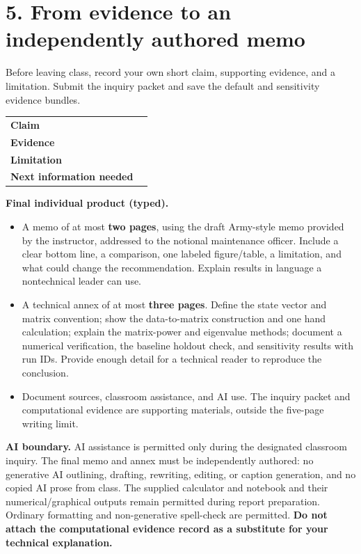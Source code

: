\documentclass[10pt,letterpaper]{article}
\begin{document}
\newpage
\section*{5. From evidence to an independently authored memo}
Before leaving class, record your own short claim, supporting evidence, and a limitation. Submit the inquiry packet and save the default and sensitivity evidence bundles.
\begin{center}
\begin{tabularx}{\textwidth}{>{\bfseries}p{1.05in}Y}
\toprule
Claim & \\[0.45in]
Evidence & \\[0.45in]
Limitation & \\[0.45in]
Next information needed & \\[0.45in]
\bottomrule
\end{tabularx}
\end{center}
\textbf{Final individual product (typed).}
\begin{itemize}[nosep]
\item A memo of at most \textbf{two pages}, using the draft Army-style memo provided by the instructor, addressed to the notional maintenance officer. Include a clear bottom line, a comparison, one labeled figure/table, a limitation, and what could change the recommendation. Explain results in language a nontechnical leader can use.
\item A technical annex of at most \textbf{three pages}. Define the state vector and matrix convention; show the data-to-matrix construction and one hand calculation; explain the matrix-power and eigenvalue methods; document a numerical verification, the baseline holdout check, and sensitivity results with run IDs. Provide enough detail for a technical reader to reproduce the conclusion.
\item Document sources, classroom assistance, and AI use. The inquiry packet and computational evidence are supporting materials, outside the five-page writing limit.
\end{itemize}
\textbf{AI boundary.} AI assistance is permitted only during the designated classroom inquiry. The final memo and annex must be independently authored: no generative AI outlining, drafting, rewriting, editing, or caption generation, and no copied AI prose from class. The supplied calculator and notebook and their numerical/graphical outputs remain permitted during report preparation. Ordinary formatting and non-generative spell-check are permitted.
\textbf{Do not attach the computational evidence record as a substitute for your technical explanation.}
\end{document}
